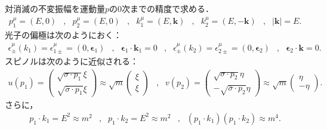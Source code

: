 対消滅の不変振幅を運動量$p$の$0$次までの精度で求める．
\begin{align*}
  p_1^\mu  = (E, 0)
  & , &
  p_2^\mu = (E, 0)
  & , &
  k_1^\mu = (E, \boldsymbol{k})
  & , &
  k_2^\mu = (E, -\boldsymbol{k})
  & , &
  \lvert\boldsymbol{k}\rvert = E
  .
\end{align*}
光子の偏極は次のようにおく：
\begin{align*}
  \epsilon_{\pm}^\mu(k_1) = \epsilon_{1\pm}^\mu = (0, \boldsymbol{\epsilon}_1)
  & , &
  \boldsymbol{\epsilon}_1 \cdot \boldsymbol{k}_1 = 0
  & , &
  \epsilon_{\pm}^\mu(k_2) = \epsilon_{2\pm}^\mu = (0, \boldsymbol{\epsilon}_2)
  & , &
  \boldsymbol{\epsilon}_2 \cdot \boldsymbol{k} = 0
  .
\end{align*}
スピノルは次のように近似される：
\begin{align}
  u(p_1) =
  \begin{pmatrix}
    \sqrt{\sigma \cdot p_1} \xi \\
    \sqrt{\overline\sigma \cdot p_1} \xi
  \end{pmatrix}
  \approx \sqrt{m}
  \begin{pmatrix}
    \xi \\
    \xi
  \end{pmatrix}
  & , &
  v(p_2) =
  \begin{pmatrix}
    \sqrt{\sigma \cdot p_2} \eta \\
    -\sqrt{\overline\sigma \cdot p_2} \eta
  \end{pmatrix}
  \approx \sqrt{m}
  \begin{pmatrix}
    \eta \\
    - \eta
  \end{pmatrix}
  . \label{prob5_4a_spinor_approx}
\end{align}
さらに，
\begin{align*}
  p_1 \cdot k_1 = E^2 \approx m^2
  & , &
  p_1 \cdot k_2 = E^2 \approx m^2
  & , &
  (p_1 \cdot k_1)(p_1 \cdot k_2) \approx m^4 .
\end{align*}

